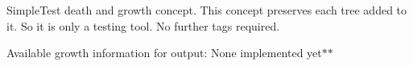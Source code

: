 Simple\+Test death and growth concept. This concept preserves each tree added to it. So it is only a testing tool. No further tags required.

Available growth information for output\+: None implemented yet$\ast$$\ast$ 